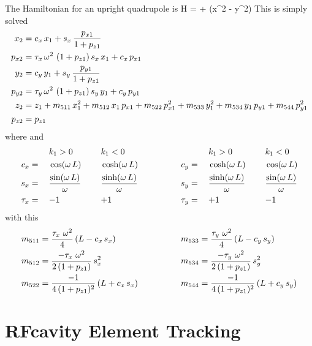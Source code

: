 The Hamiltonian for an upright quadrupole is
\Begineq
  H =  +  (x^2 - y^2)
\Endeq
This is simply solved
\begin{align}
  x_2    &= c_x \, x_1 + s_x \, \frac{p_{x1}}{1 + p_{z1}} \nonumber \\
  p_{x2} &= \tau_x \, \omega^2 \, \, (1 + p_{z1}) \, s_x \, x_1 + c_x \, p_{x1} \nonumber \\
  y_2    &= c_y \, y_1 + s_y \, \frac{p_{y1}}{1 + p_{z1}} \nonumber \\
  p_{y2} &= \tau_y \, \omega^2 \, \, (1 + p_{z1}) \, s_y \, y_1 + c_y \, p_{y1} \\
  z_2    &= z_1 + m_{511} \, x_1^2 + m_{512} \, x_1 \, p_{x1} + m_{522} \, p_{x1}^2 + 
                   m_{533} \, y_1^2 + m_{534} \, y_1 \, p_{y1} + m_{544} \, p_{y1}^2 \nonumber \\
  p_{z2} &= p_{z1} \nonumber
\end{align}
where 
\Begineq
  \om \equiv {}
\Endeq
and
\begin{alignat}{6}
         &\hspace*{3ex}  && k_1 > 0          &\hspace*{3ex}& k_1 < 0 & \qquad \qquad
         &\hspace*{3ex}  && k_1 > 0          &\hspace*{3ex}& k_1 < 0 \nonumber \\
     c_x &=   && \cos  (\omega \, L) && \cosh (\omega \, L) & \qquad \qquad
     c_y &=   && \cosh (\omega \, L) && \cos  (\omega \, L) \nonumber \\
     s_x &=   && \frac{\sin  (\omega \, L)}{\omega} && \frac{\sinh (\omega \, L)}{\omega} & \qquad \qquad
     s_y &=   && \frac{\sinh (\omega \, L)}{\omega} && \frac{\sin  (\omega \, L)}{\omega} \\
  \tau_x &=   && {-}1             && {+}1             & \qquad \qquad
  \tau_y &=   && {+}1             && {-}1             \nonumber
\end{alignat}
with this
\begin{alignat}{2}
  m_{511} &= \frac{\tau_x \,\, \omega^2}{4} \, (L - c_x \, s_x) & \qquad \qquad
  m_{533} &= \frac{\tau_y \,\, \omega^2}{4} \, (L - c_y \, s_y) \nonumber \\
  m_{512} &= \frac{-\tau_x \,\, \omega^2}{2 \, (1 + p_{z1})} \, s_x^2 & \qquad \qquad
  m_{534} &= \frac{-\tau_y \,\, \omega^2}{2 \, (1 + p_{z1})} \, s_y^2 \\
  m_{522} &= \frac{-1}{4 \, (1 + p_{z1})^2} \, (L + c_x \, s_x) & \qquad \qquad
  m_{544} &= \frac{-1}{4 \, (1 + p_{z1})^2} \, (L + c_y \, s_y) \nonumber
\end{alignat}

\section{RFcavity Element Tracking}
\label{s:rfcavity.std}

